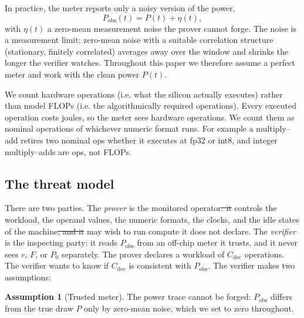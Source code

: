 \documentclass{article}
\makeatletter
\theoremstyle{plain}
\theoremstyle{definition}
\newtheorem{assumption}[assumption]{Assumption}
\theoremstyle{remark}
\providecommand{\DIFaddtex}[1]{{\protect\color{blue}\uwave{#1}}} %
\providecommand{\DIFdeltex}[1]{{\protect\color{red}\sout{#1}}} %
\providecommand{\DIFaddbegin}{} %
\providecommand{\DIFaddend}{} %
\providecommand{\DIFdelbegin}{} %
\providecommand{\DIFdelend}{} %
\providecommand{\DIFadd}[1]{\texorpdfstring{\DIFaddtex{#1}}{#1}} %
\providecommand{\DIFdel}[1]{\texorpdfstring{\DIFdeltex{#1}}{}} %
\providecommand{\DIFscaledelfig}{0.5}
\newlength{\DIFdelgraphicswidth} %
\newlength{\DIFdelgraphicsheight} %
\providecommand{\DIFaddincludegraphics}[2][]{{\color{blue}\fbox{\DIFOincludegraphics[#1]{#2}}}} %
\providecommand{\DIFdelincludegraphics}[2][]{%
\sbox{\DIFdelgraphicsbox}{\DIFOincludegraphics[#1]{#2}}%
\settoboxwidth{\DIFdelgraphicswidth}{\DIFdelgraphicsbox} %
\settoboxtotalheight{\DIFdelgraphicsheight}{\DIFdelgraphicsbox} %
\scalebox{\DIFscaledelfig}{%
\parbox[b]{\DIFdelgraphicswidth}{\usebox{\DIFdelgraphicsbox}\\[-\baselineskip] \rule{\DIFdelgraphicswidth}{0em}}\llap{\resizebox{\DIFdelgraphicswidth}{\DIFdelgraphicsheight}{%
\setlength{\unitlength}{\DIFdelgraphicswidth}%
\begin{picture}(1,1)%
\thicklines\linethickness{2pt} %
{\color[rgb]{1,0,0}\put(0,0){\framebox(1,1){}}}%
{\color[rgb]{1,0,0}\put(0,0){\line( 1,1){1}}}%
{\color[rgb]{1,0,0}\put(0,1){\line(1,-1){1}}}%
\end{picture}%
}\hspace*{3pt}}} %
} %
\DeclareRobustCommand{\DIFaddbegin}{\DIFOaddbegin \let\includegraphics\DIFaddincludegraphics} %
\DeclareRobustCommand{\DIFaddend}{\DIFOaddend \let\includegraphics\DIFOincludegraphics} %
\DeclareRobustCommand{\DIFdelbegin}{\DIFOdelbegin \let\includegraphics\DIFdelincludegraphics} %
\DeclareRobustCommand{\DIFdelend}{\DIFOaddend \let\includegraphics\DIFOincludegraphics} %
\let\sout@orig\sout %
\renewcommand{\sout}[1]{\ifmmode\text{\sout@orig{\ensuremath{#1}}}\else\sout@orig{#1}\fi} %
\makeatother
\begin{document}
In practice, the meter reports only a noisy version of the power,
\begin{equation}
	P_{\mathrm{obs}}(t) = P(t) + \eta(t),
	\label{eq:obs}
\end{equation}
with $\eta(t)$ a zero-mean measurement noise the prover cannot forge. The
noise is a measurement limit; zero-mean noise with a suitable correlation
structure (stationary, finitely correlated) averages away over
the window and shrinks the longer the verifier watches. Throughout this paper
we therefore assume a perfect meter and work with the clean power $P(t)$.

We count
hardware operations (i.e. what the silicon actually executes) rather than
model FLOPs (i.e. the algorithmically required operations).  Every executed operation costs joules, so
the meter sees hardware operations. We count them as
nominal operations of whichever numeric format runs. For example a multiply--add
retires two nominal ops whether it executes at fp32 or int8, and integer
multiply--adds are ops, not FLOPs. 

\subsection{The threat model}
\label{subsec:threat}

There are two parties. The \emph{prover} is the monitored operator\DIFdelbegin \DIFdel{: it }\DIFdelend \DIFaddbegin \DIFadd{. It }\DIFaddend controls the
workload, the operand values, the numeric formats, the clocks, and the idle
states of the machine\DIFdelbegin \DIFdel{, and it }\DIFdelend \DIFaddbegin \DIFadd{. It }\DIFaddend may wish to run compute it does not declare.
The \emph{verifier} is the inspecting party: it reads $P_{\mathrm{obs}}$ from
an off-chip meter it trusts, and it never sees $r$, $F$, or $P_0$ separately.
The prover declares a workload of $C_{\mathrm{dec}}$ operations. The verifier wants to know if  $C_{\mathrm{dec}}$ is consistent with $P_{\mathrm{obs}}$. The verifier makes two assumptions:
\begin{assumption}[Trusted meter]
\label{ass:meter}
The power trace cannot be forged: $P_{\mathrm{obs}}$ differs from the true
draw $P$ only by zero-mean noise, which we set to zero throughout.
\end{assumption}
\end{document}
